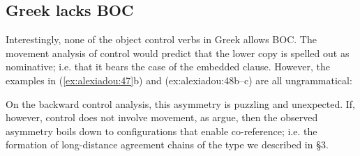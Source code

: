 \documentclass[output=paper]{langsci/langscibook}
\begin{document}
\subsection{Greek lacks BOC}%

Interestingly, none of the object control verbs in Greek allows BOC. The movement analysis of control would predict that the lower copy is spelled out as nominative; i.e. that it bears the case of the embedded clause. However, the examples in (\ref{ex:alexiadou:47}b) and ({ex:alexiadou:48}b--c) are all ungrammatical:



\ea%
    \label{ex:alexiadou:47}
    \z
\z    


\ea%
    \label{ex:alexiadou:48}
    \z
\z
 
On the backward control analysis, this asymmetry is puzzling and unexpected. If, however, control does not involve movement, as \citet{Tsakali2017} argue, then the observed asymmetry boils down to configurations that enable co-reference; i.e. the formation of long-distance agreement chains of the type we described in §3. 
\end{document}
